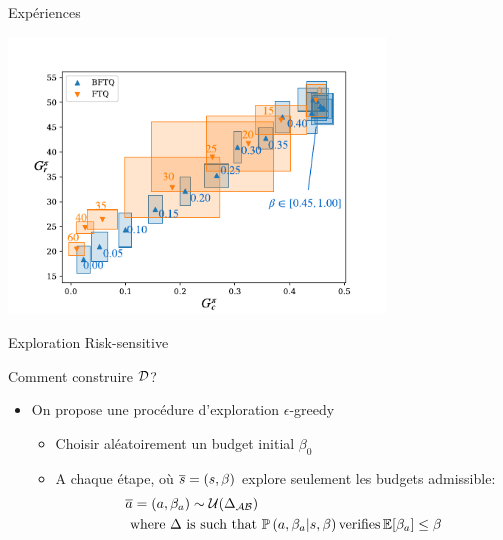 \documentclass[french,handout]{beamer}
\begin{document}
    \begin{frame}{Expériences}
        \begin{center}
            \includegraphics[width=0.75\textwidth]{img/slot-filling.pdf}
        \end{center}
    \end{frame}

    \begin{frame}{Exploration Risk-sensitive}

       Comment construire $\mathcal{D}$?

        \begin{itemize}
            \item On propose une procédure d'exploration $\epsilon$-greedy
            \begin{itemize}
                \pause\item Choisir aléatoirement un budget initial $\beta_0$
                \pause\item A chaque étape, où $\overline{s}=(s,\beta)$ explore seulement les budgets admissible:
                \pause\begin{align*}
                          &\overline{a} = (a, \beta_a)\sim\mathcal{U}(\Delta_{\mathcal{A}\mathcal{B}})\\
                          &\text{ where }  \Delta \text{ is such that }\mathbb{P}\left(a, \beta_a|s, \beta\right) \text{verifies} \operatorname*{\mathbb{E}}[\beta_a]\leq\beta
                \end{align*}
            \end{itemize}
        \end{itemize}


    \end{frame}
\end{document}
